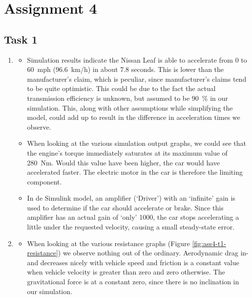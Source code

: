 \documentclass[11pt,titlepage]{report}
\begin{document}
\chapter{Assignment 4}
\section{Task 1}

\begin{enumerate}
\item
	\begin{itemize}
		\item
		Simulation results indicate the Nissan Leaf is able to accelerate from \num{0} to \SI{60}{mph} (\SI{96.6}{km/h}) in about \num{7.8} seconds. This is lower than the manufacturer's claim, which is peculiar, since manufacturer's claims tend to be quite optimistic. This could be due to the fact the actual transmission efficiency is unknown, but assumed to be \SI{90}{\percent} in our simulation. This, along with other assumptions while simplifying the model, could add up to result in the difference in acceleration times we observe.

		\item
		When looking at the various simulation output graphs, we could see that the engine's torque immediately saturates at its maximum value of \SI{280}{Nm}. Would this value have been higher, the car would have accelerated faster. The electric motor in the car is therefore the limiting component.

		\item
		In de Simulink model, an amplifier (`Driver') with an `infinite' gain is used to determine if the car should accelerate or brake. Since this amplifier has an actual gain of `only' \num{1000}, the car stops accelerating a little under the requested velocity, causing a small steady-state error.
	\end{itemize}

\item
	\begin{itemize}
		\item
		When looking at the various resistance graphs (Figure \ref{fig:ass4-t1-resistance}) we observe nothing out of the ordinary. Aerodynamic drag in- and decreases nicely with vehicle speed and friction is a constant value when vehicle velocity is greater than zero and zero otherwise. The gravitational force is at a constant zero, since there is no inclination in our simulation.


\end{itemize}
\end{enumerate}
\end{document}
